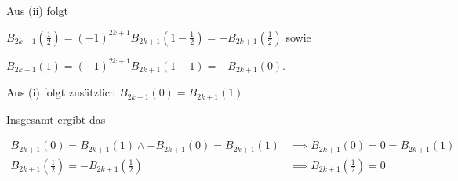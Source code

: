 \documentclass[]{article}
\begin{document}
Aus (ii) folgt

$B_{2k+1}(\frac{1}{2})=(-1)^{2k+1}B_{2k+1}(1-\frac{1}{2})=-B_{2k+1}(\frac{1}{2})$ sowie

$B_{2k+1}(1)=(-1)^{2k+1}B_{2k+1}(1-1)=-B_{2k+1}(0)$.

Aus (i) folgt zusätzlich $B_{2k+1}(0) = B_{2k+1}(1)$.

Insgesamt ergibt das

\begin{align*}
	B_{2k+1}(0) = B_{2k+1}(1) \land - B_{2k+1}(0) = B_{2k+1}(1) &\implies B_{2k+1}(0) = 0 = B_{2k+1}(1) \\
	B_{2k+1}(\frac{1}{2}) = -B_{2k+1}(\frac{1}{2}) &\implies B_{2k+1}(\frac{1}{2}) = 0
\end{align*}
\end{document}
